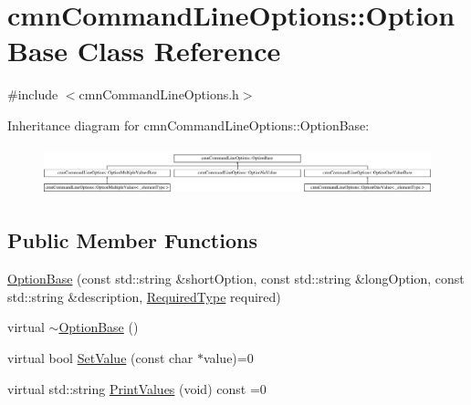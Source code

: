 \hypertarget{classcmn_command_line_options_1_1_option_base}{\section{cmn\-Command\-Line\-Options\-:\-:Option\-Base Class Reference}
\label{classcmn_command_line_options_1_1_option_base}
}


{\ttfamily \#include $<$cmn\-Command\-Line\-Options.\-h$>$}

Inheritance diagram for cmn\-Command\-Line\-Options\-:\-:Option\-Base\-:\begin{figure}[H]
\begin{center}
\leavevmode
\includegraphics[height=1.424936cm]{dc/dd4/classcmn_command_line_options_1_1_option_base}
\end{center}
\end{figure}
\subsection*{Public Member Functions}
\begin{DoxyCompactItemize}
\item 
\hyperlink{classcmn_command_line_options_1_1_option_base_ac8abda74a567eea97e393386dd151065}{Option\-Base} (const std\-::string \&short\-Option, const std\-::string \&long\-Option, const std\-::string \&description, \hyperlink{classcmn_command_line_options_ac239a3ca62dd4e3b391824f6f1a97c76}{Required\-Type} required)
\item 
virtual \hyperlink{classcmn_command_line_options_1_1_option_base_aa591fb2235a2923173c494a078ae24d8}{$\sim$\-Option\-Base} ()
\item 
virtual bool \hyperlink{classcmn_command_line_options_1_1_option_base_a738dbf56caefe3ee0f5eb9c3cc33bdd6}{Set\-Value} (const char $\ast$value)=0
\item 
virtual std\-::string \hyperlink{classcmn_command_line_options_1_1_option_base_ad21a08c2e066fc6948ab203e75a4fa80}{Print\-Values} (void) const =0
\end{DoxyCompactItemize}
